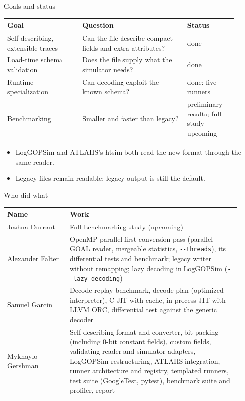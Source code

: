\documentclass[aspectratio=169,11pt]{beamer}
\begin{document}
\begin{frame}{Goals and status}
\small
\begin{tabular}{L{0.3\linewidth}L{0.42\linewidth}L{0.2\linewidth}}
\toprule
\textbf{Goal} & \textbf{Question} & \textbf{Status} \\
\midrule
Self-describing, extensible traces & Can the file describe compact fields and extra attributes? & done \\
Load-time schema validation & Does the file supply what the simulator needs? & done \\
Runtime specialization & Can decoding exploit the known schema? & done: five runners \\
Benchmarking & Smaller and faster than legacy? & preliminary results; full study upcoming \\
\bottomrule
\end{tabular}
\vspace{4mm}
\begin{itemize}
\item LogGOPSim and ATLAHS's htsim both read the new format through the same reader.
\item Legacy files remain readable; legacy output is still the default.
\end{itemize}
\end{frame}

\begin{frame}{Who did what}
\small
\begin{tabular}{L{0.25\linewidth}L{0.68\linewidth}}
\toprule
\textbf{Name} & \textbf{Work} \\
\midrule
Joshua Durrant & Full benchmarking study (upcoming) \\
Alexander Falter & OpenMP-parallel first conversion pass (parallel GOAL reader, mergeable statistics, \texttt{-{}-threads}), its differential tests and benchmark; legacy writer without remapping; lazy decoding in LogGOPSim (\texttt{-{}-lazy-decoding}) \\
Samuel Garcin & Decode replay benchmark, decode plan (optimized interpreter), C JIT with cache, in-process JIT with LLVM ORC, differential test against the generic decoder \\
Mykhaylo Gershman & Self-describing format and converter, bit packing (including 0-bit constant fields), custom fields, validating reader and simulator adapters, LogGOPSim restructuring, ATLAHS integration, runner architecture and registry, templated runners, test suite (GoogleTest, pytest), benchmark suite and profiler, report \\
\bottomrule
\end{tabular}
\end{frame}
\end{document}
